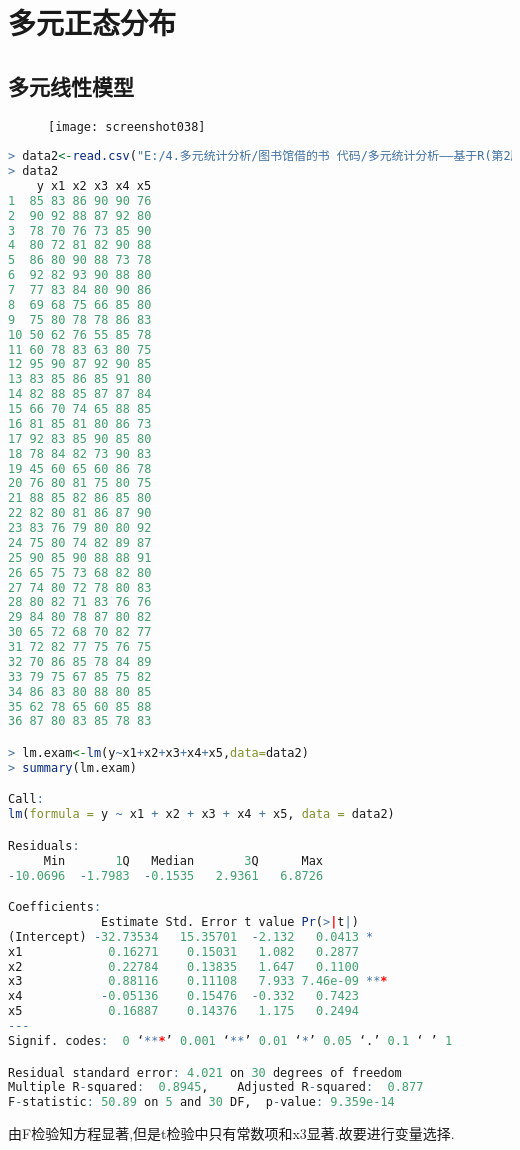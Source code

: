 \documentclass[11pt,a4paper,oneside]{book}
\begin{document}
\chapter{多元正态分布}
\section{多元线性模型}
\begin{figure}[H]
	\centering
	\texttt{[image: screenshot038]}
\end{figure}
\begin{lstlisting}[language=r]
> data2<-read.csv("E:/4.多元统计分析/图书馆借的书 代码/多元统计分析——基于R(第2版) R-data/eg2.1.csv",header=TRUE)
> data2
    y x1 x2 x3 x4 x5
1  85 83 86 90 90 76
2  90 92 88 87 92 80
3  78 70 76 73 85 90
4  80 72 81 82 90 88
5  86 80 90 88 73 78
6  92 82 93 90 88 80
7  77 83 84 80 90 86
8  69 68 75 66 85 80
9  75 80 78 78 86 83
10 50 62 76 55 85 78
11 60 78 83 63 80 75
12 95 90 87 92 90 85
13 83 85 86 85 91 80
14 82 88 85 87 87 84
15 66 70 74 65 88 85
16 81 85 81 80 86 73
17 92 83 85 90 85 80
18 78 84 82 73 90 83
19 45 60 65 60 86 78
20 76 80 81 75 80 75
21 88 85 82 86 85 80
22 82 80 81 86 87 90
23 83 76 79 80 80 92
24 75 80 74 82 89 87
25 90 85 90 88 88 91
26 65 75 73 68 82 80
27 74 80 72 78 80 83
28 80 82 71 83 76 76
29 84 80 78 87 80 82
30 65 72 68 70 82 77
31 72 82 77 75 76 75
32 70 86 85 78 84 89
33 79 75 67 85 75 82
34 86 83 80 88 80 85
35 62 78 65 60 85 88
36 87 80 83 85 78 83

> lm.exam<-lm(y~x1+x2+x3+x4+x5,data=data2)
> summary(lm.exam)

Call:
lm(formula = y ~ x1 + x2 + x3 + x4 + x5, data = data2)

Residuals:
     Min       1Q   Median       3Q      Max 
-10.0696  -1.7983  -0.1535   2.9361   6.8726 

Coefficients:
             Estimate Std. Error t value Pr(>|t|)    
(Intercept) -32.73534   15.35701  -2.132   0.0413 *  
x1            0.16271    0.15031   1.082   0.2877    
x2            0.22784    0.13835   1.647   0.1100    
x3            0.88116    0.11108   7.933 7.46e-09 ***
x4           -0.05136    0.15476  -0.332   0.7423    
x5            0.16887    0.14376   1.175   0.2494    
---
Signif. codes:  0 ‘***’ 0.001 ‘**’ 0.01 ‘*’ 0.05 ‘.’ 0.1 ‘ ’ 1

Residual standard error: 4.021 on 30 degrees of freedom
Multiple R-squared:  0.8945,	Adjusted R-squared:  0.877 
F-statistic: 50.89 on 5 and 30 DF,  p-value: 9.359e-14
\end{lstlisting}
由F检验知方程显著,但是t检验中只有常数项和x3显著.故要进行变量选择.
\end{document}
